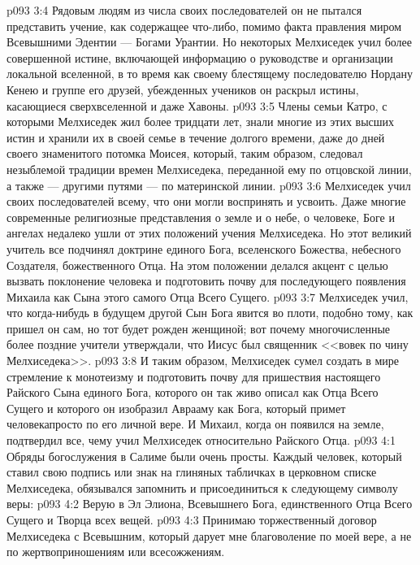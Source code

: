 \vs p093 3:4 Рядовым людям из числа своих последователей он не пытался представить учение, как содержащее что\hyp{}либо, помимо факта правления миром Всевышними Эдентии --- Богами Урантии. Но некоторых Мелхиседек учил более совершенной истине, включающей информацию о руководстве и организации локальной вселенной, в то время как своему блестящему последователю Нордану Кенею и группе его друзей, убежденных учеников он раскрыл истины, касающиеся сверхвселенной и даже Хавоны.
\vs p093 3:5 Члены семьи Катро, с которыми Мелхиседек жил более тридцати лет, знали многие из этих высших истин и хранили их в своей семье в течение долгого времени, даже до дней своего знаменитого потомка Моисея, который, таким образом, следовал незыблемой традиции времен Мелхиседека, переданной ему по отцовской линии, а также --- другими путями --- по материнской линии.
\vs p093 3:6 Мелхиседек учил своих последователей всему, что они могли воспринять и усвоить. Даже многие современные религиозные представления о земле и о небе, о человеке, Боге и ангелах недалеко ушли от этих положений учения Мелхиседека. Но этот великий учитель все подчинял доктрине единого Бога, вселенского Божества, небесного Создателя, божественного Отца. На этом положении делался акцент с целью вызвать поклонение человека и подготовить почву для последующего появления Михаила как Сына этого самого Отца Всего Сущего.
\vs p093 3:7 Мелхиседек учил, что когда\hyp{}нибудь в будущем другой Сын Бога явится во плоти, подобно тому, как пришел он сам, но тот будет рожден женщиной; вот почему многочисленные более поздние учители утверждали, что Иисус был священник <<вовек по чину Мелхиседека>>.
\vs p093 3:8 И таким образом, Мелхиседек сумел создать в мире стремление к монотеизму и подготовить почву для пришествия настоящего Райского Сына единого Бога, которого он так живо описал как Отца Всего Сущего и которого он изобразил Аврааму как Бога, который примет человекапросто по его личной вере. И Михаил, когда он появился на земле, подтвердил все, чему учил Мелхиседек относительно Райского Отца.
\vs p093 4:1 Обряды богослужения в Салиме были очень просты. Каждый человек, который ставил свою подпись или знак на глиняных табличках в церковном списке Мелхиседека, обязывался запомнить и присоединиться к следующему символу веры:
\vs p093 4:2 \bibnobreakspace Верую в Эл Элиона, Всевышнего Бога, единственного Отца Всего Сущего и Творца всех вещей.
\vs p093 4:3 \bibnobreakspace Принимаю торжественный договор Мелхиседека с Всевышним, который дарует мне благоволение по моей вере, а не по жертвоприношениям или всесожжениям.
